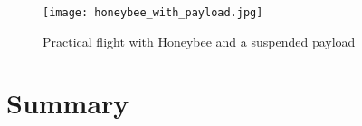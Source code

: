 {        \begin{figure}[!htb]
            \centering
            \texttt{[image: honeybee\_with\_payload.jpg]}
            \caption{Practical flight with Honeybee and a suspended payload}
            \label{fig:honeybee_with_payload}
        \end{figure}

    \FloatBarrier\section{Summary}

}
